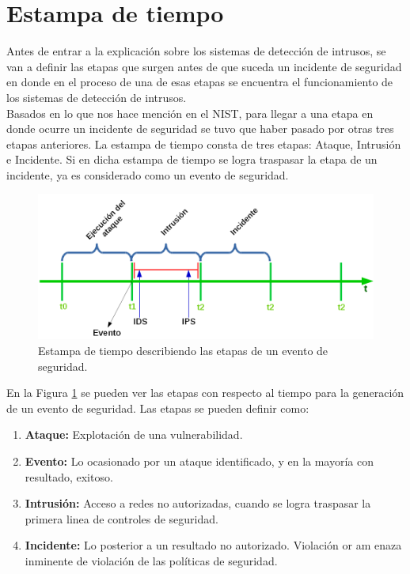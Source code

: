 \section{Estampa de tiempo}

Antes de entrar a la explicación sobre los sistemas de detección de intrusos, se van a definir las etapas que surgen antes de que suceda un incidente de seguridad en donde en el proceso de una de esas etapas se encuentra el funcionamiento de los sistemas de detección de intrusos.\\

Basados en lo que nos hace mención en el NIST, para llegar a una etapa en donde ocurre un incidente de seguridad se tuvo que haber pasado por otras tres etapas anteriores. La estampa de tiempo consta de tres etapas: Ataque, Intrusión e Incidente. Si en dicha estampa de tiempo se logra traspasar la etapa de un incidente, ya es considerado como un evento de seguridad.\\ 

\begin{figure}
	\centering
	\includegraphics[scale=.4]{images/time_stamp}
	\caption{Estampa de tiempo describiendo las etapas de un evento de seguridad.}
	\label{fig:time_stamp}
\end{figure}

En la Figura \ref{fig:time_stamp} se pueden ver las etapas con respecto al tiempo para la generación de un evento de seguridad. Las etapas se pueden definir como:\\
\begin{enumerate}
	\item \textbf{Ataque:} Explotación de una vulnerabilidad.
	\item \textbf{Evento:} Lo ocasionado por un ataque identificado, y en la mayoría con resultado, exitoso.
	\item \textbf{Intrusión:} Acceso a redes no autorizadas, cuando se logra traspasar la primera linea de controles de seguridad.
	\item \textbf{Incidente:} Lo posterior a un resultado no autorizado. Violación or am	enaza inminente de violación de las políticas de seguridad.
\end{enumerate}


